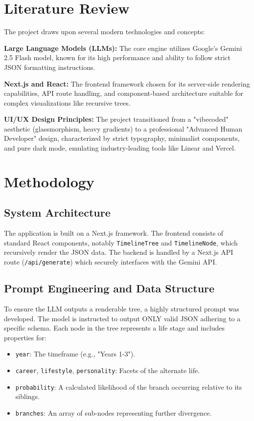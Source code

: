 \documentclass[12pt,a4paper]{report}
\begin{document}
\chapter{Literature Review}
The project draws upon several modern technologies and concepts:
\par\noindent
\textbf{Large Language Models (LLMs):} The core engine utilizes Google's Gemini 2.5 Flash model, known for its high performance and ability to follow strict JSON formatting instructions.
\par\noindent
\textbf{Next.js and React:} The frontend framework chosen for its server-side rendering capabilities, API route handling, and component-based architecture suitable for complex visualizations like recursive trees.
\par\noindent
\textbf{UI/UX Design Principles:} The project transitioned from a "vibecoded" aesthetic (glassmorphism, heavy gradients) to a professional "Advanced Human Developer" design, characterized by strict typography, minimalist components, and pure dark mode, emulating industry-leading tools like Linear and Vercel.

\chapter{Methodology}
\section{System Architecture}
The application is built on a Next.js framework. The frontend consists of standard React components, notably \texttt{TimelineTree} and \texttt{TimelineNode}, which recursively render the JSON data. The backend is handled by a Next.js API route (\texttt{/api/generate}) which securely interfaces with the Gemini API.

\section{Prompt Engineering and Data Structure}
To ensure the LLM outputs a renderable tree, a highly structured prompt was developed. The model is instructed to output ONLY valid JSON adhering to a specific schema. Each node in the tree represents a life stage and includes properties for:
\begin{itemize}
    \item \texttt{year}: The timeframe (e.g., "Years 1-3").
    \item \texttt{career}, \texttt{lifestyle}, \texttt{personality}: Facets of the alternate life.
    \item \texttt{probability}: A calculated likelihood of the branch occurring relative to its siblings.
    \item \texttt{branches}: An array of sub-nodes representing further divergence.
\end{itemize}
\end{document}
